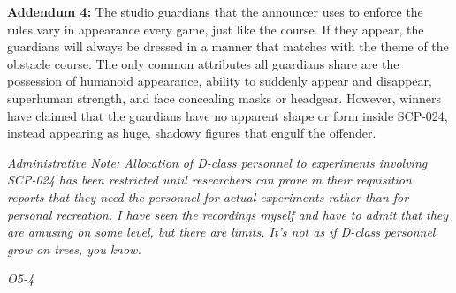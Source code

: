 \textbf{Addendum 4:} The studio guardians that the announcer uses to enforce the rules vary in appearance every game, just like the course. If they appear, the guardians will always be dressed in a manner that matches with the theme of the obstacle course. The only common attributes all guardians share are the possession of humanoid appearance, ability to suddenly appear and disappear, superhuman strength, and face concealing masks or headgear. However, winners have claimed that the guardians have no apparent shape or form inside SCP-024, instead appearing as huge, shadowy figures that engulf the offender.

\textsl{Administrative Note: Allocation of D-class personnel to experiments involving SCP-024 has been restricted until researchers can prove in their requisition reports that they need the personnel for actual experiments rather than for personal recreation. I have seen the recordings myself and have to admit that they are amusing on some level, but there are limits. It's not as if D-class personnel grow on trees, you know.}

\textsl{O5-4}